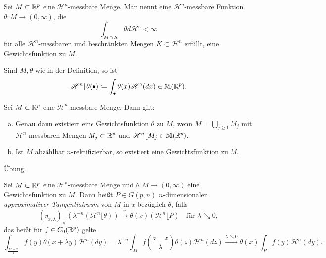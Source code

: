 \documentclass[a4paper,twoside,DIV15,BCOR12mm]{scrbook}
\newcommand{\HM}{\mathscr H}
\newcommand{\downto}{\mathrel\searrow}
\newcommand{\MR}{\lfloor}
\begin{document}
\begin{definition}
Sei \(M \subset \mathbb{R}^p\) eine \(\HM^n\)-messbare Menge. Man nennt eine \(\HM^n\)-messbare  Funktion \(\theta: M \to (0,\infty)\), die 
\[
\int_{M\cap K} \theta d\HM^n < \infty
\]
für alle \(\HM^n\)-messbaren und beschränkten Mengen \(K \subset \HM^n\)  erfüllt, 
eine Gewichtsfunktion zu \(M\).
\end{definition}

\begin{bemerkung}
Sind \(M, \theta\) wie in der Definition, so ist
\[
\HM^n\MR\theta(\bullet) \da \int_\bullet \theta(x) \HM^n(dx) \in \mathbb M(\MdR^p).
\]
\end{bemerkung}

\begin{lemma}\label{lem:3.23}
Sei \(M \subset \mathbb{R}^p\) eine \(\HM^n\)-messbare Menge. Dann gilt:
\begin{enumerate}[(a)]
\item Genau dann existiert eine Gewichtsfunktion \(\theta\) zu \(M\), wenn \(M = \bigcup_{j\geq1} M_j\) mit \(\HM^n\)-messbaren Mengen \(M_j \subset \mathbb{R}^p\) und \(\HM^n \MR M_j \in \mathbb M(\MdR^p)\).
\item Ist \(M\) abzählbar \(n\)-rektifizierbar, so existiert eine Gewichtsfunktion zu \(M\).
\end{enumerate}
\end{lemma}
\begin{beweis} Übung. \end{beweis}

\begin{definition}
Sei \(M \subset \mathbb{R}^p\) eine \( \HM^n\)-messbare Menge und \(\theta: M \to (0,\infty)\) eine Gewichtsfunktion zu \(M\). Dann heißt \(P \in G(p,n)\) \(n\)-dimensionaler \emph{approximativer Tangentialraum} von \(M\) in \(x\) bezüglich \(\theta\), falls
\[
(\eta_{x,\lambda})_\# \left(\lambda^{-n}(\HM^n\MR \theta)\right) \stackrel{v}\to \theta(x) (\HM^n \MR P) \quad \text{für }\lambda\downto0,
\]
das heißt für \(f\in C_0(\mathbb{R}^p)\) gelte
\[
\int_{\frac{M-x}\lambda} f(y) \theta(x+\lambda y) \HM^n(dy) = \lambda^{-n} \int_M f(\frac{z-x}\lambda) \theta(z) \HM^n(dz) \xrightarrow{\lambda\downto0} \theta(x) \int_P f(y) \HM^n(dy).
\]
\end{definition}
\end{document}
